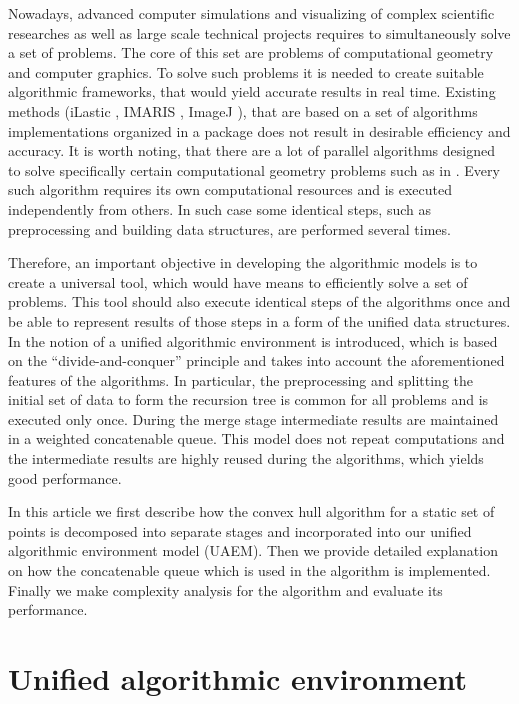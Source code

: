 \documentclass[conference]{IEEEtran}
\theoremstyle{plane}
\begin{document}
		Nowadays, advanced computer simulations and visualizing of complex scientific researches as well as large scale technical projects requires to simultaneously solve a set of problems. The core of this set are problems of computational geometry and computer graphics. To solve such problems it is needed to create suitable algorithmic frameworks, that would yield accurate results in real time. Existing methods (iLastic \cite{ilastik}, IMARIS \cite{imaris}, ImageJ \cite{imagej}), that are based on a set of algorithms implementations organized in a package does not result in desirable efficiency and accuracy. It is worth noting, that there are a lot of parallel algorithms designed to solve specifically certain computational geometry problems such as in \cite{aggarwal,atallah,cole,amato,chen,berkman,goodman,akl,jaja,leeuwen,reif}. Every such algorithm requires its own computational resources and is executed independently from others. In such case some identical steps, such as preprocessing and building data structures, are performed several times. 
		
		Therefore, an important objective in developing the algorithmic models is to create a universal tool, which would have means to efficiently solve a set of problems. This tool should also execute identical steps of the algorithms once and be able to represent results of those steps in a form of the unified data structures. In \cite{tereshchenko} the notion of a unified algorithmic environment is introduced, which is based on the ``divide-and-conquer'' principle and takes into account the aforementioned features of the algorithms. In particular, the preprocessing and splitting the initial set of data to form the recursion tree is common for all problems and is executed only once. During the merge stage intermediate results are maintained in a weighted concatenable queue. This model does not repeat computations and the intermediate results are highly reused during the algorithms, which yields good performance.
		
		In this article we first describe how the convex hull algorithm for a static set of points is decomposed into separate stages and incorporated into our unified algorithmic environment model (UAEM). Then we provide detailed explanation on how the concatenable queue which is used in the algorithm is implemented. Finally we make complexity analysis for the algorithm and evaluate its performance.

\section{Unified algorithmic environment}
\end{document}
